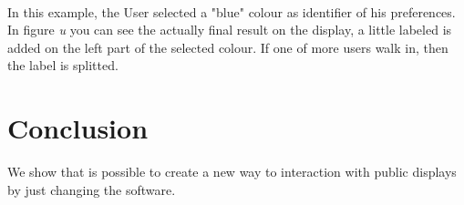\documentclass[]{usiinfbachelorproject}
\begin{document}
\begin{figure}[H]
  \centering
   \
  \
  \
     \
  \
  \
\end{figure}
In this example, the User selected a "blue" colour as identifier of his preferences. In figure \emph{u} you can see the actually final result on the display, a little labeled is added on the left part of the selected colour. If one of more users walk in, then the label is splitted.
\begin{figure}[H]
  \centering
\end{figure}

\section{Conclusion}
We show that is possible to create a new way to interaction with public displays by just changing the software. 


\newpage


\end{document}
